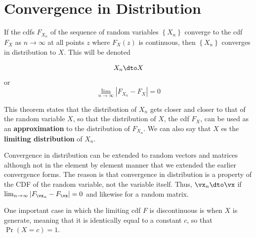 \documentclass[english,12pt]{book}\usepackage[]{graphicx}\usepackage[]{xcolor}
\begin{document}



\section{Convergence in Distribution}


\begin{definition}\label{definition:convergece_in_distribution}
	If the cdfs $F_{X_n}$ of the sequence of random variables $\left\lbrace X_n \right\rbrace $ converge to the cdf $F_{X}$ as $n\to \infty$ at all points $z$ where $F_{X}(z)$ is continuous, then $\left\lbrace X_n\right\rbrace $ converges in distribution to $X$. This will be denoted
	
	\begin{equation*}
	X_n\dto X
	\end{equation*}
%	
or 
	\begin{equation*}
	\lim_{n\to \infty}|F_{X_n}-F_{X}| = 0
	\end{equation*}
\end{definition}

This theorem states that the distribution of $X_n$ gets closer and closer to that of the random variable $X$, so that the distribution of $X$, the cdf $F_{X}$, can be used as an \textbf{approximation} to the distribution of $F_{X_n}$.  We can also say that $X$ es the \textbf{limiting distribution} of $X_n$.


Convergence in distribution can be extended to random vectors and matrices although not in the element by element manner that we extended the earlier convergence forms. The reason is that convergence in distribution is a property of the CDF of the random variable, not the variable itself. Thus, $\vx_n\dto \vx$ if $\lim_{n\to \infty}|F_{\vx_n}-F_{\vx}| = 0$ and likewise for a random matrix. 


\begin{remark}
  One important case in which the limiting cdf $F$ is discontinuous is when $X$ is generate, meaning that it is identically equal to a constant $c$, so that $\Pr(X = c) = 1$. 
\end{remark}
\end{document}
